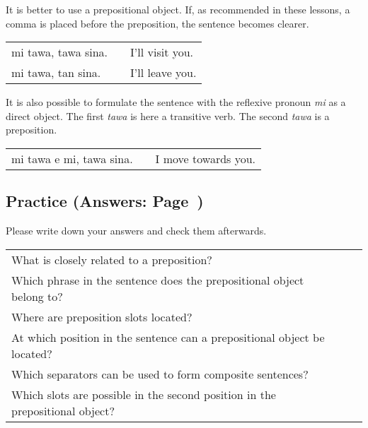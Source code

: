 It is better to use a prepositional object.
If, as recommended in these lessons, a comma is placed before the preposition, the sentence becomes clearer.

\begin{supertabular}{p{5,5cm}|ll}
    mi tawa, tawa sina. &  & I'll visit you. \\
    mi tawa, tan sina.  &  & I'll leave you. \\
\end{supertabular}

It is also possible to formulate the sentence with the reflexive pronoun \textit{mi} as a direct object.
The first \textit{tawa} is here a transitive verb.
The second \textit{tawa} is a preposition.

\begin{supertabular}{p{5,5cm}|ll}
    mi tawa e mi, tawa sina. &  & I move towards you. \\ %
\end{supertabular}

%
\newpage
%
\subsection*{Practice (Answers: Page~\pageref{'prepositional_objects'})}
%
Please write down your answers and check them afterwards.

\begin{supertabular}{p{5,5cm}|ll}
    What is closely related to a preposition?                                    &  & \\ %
    Which phrase in the sentence does the prepositional object belong to?        &  & \\ %
    Where are preposition slots located?                                         &  & \\ %
    At which position in the sentence can a prepositional object be located?     &  & \\ %
    Which separators can be used to form composite sentences?                    &  & \\ %
    Which slots are possible in the second position in the prepositional object? &  & \\ %
\end{supertabular}

